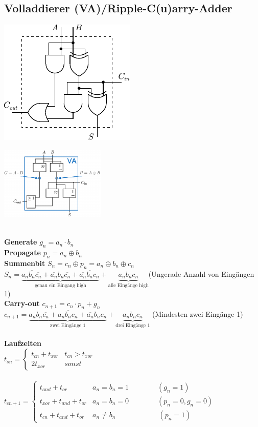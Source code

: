 \documentclass[6pt,a4paper]{scrartcl}
\newcommand{\ol}[1]{\ensuremath{\overline{#1}}}									%
\begin{document}
\begin{multicols*}{3}
\section{Volladdierer (VA)/Ripple-C(u)arry-Adder}
\parbox{5.0cm}{ \includegraphics{./img/ds/volladdierer.pdf} }
\hspace*{-.7cm}\parbox{5.0cm}{ \includegraphics[width=5.0cm]{./img/ds/volladdierer-iec.png} } \\
\textbf{Generate} $g_n = a_n \cdot b_n$\\
\textbf{Propagate} $p_n = a_n \oplus b_n$\\
\textbf{Summenbit} $S_n = c_n \oplus p_n= a_n \oplus b_n \oplus c_n$\\
$S_n = \underbrace{a_n\ol{b_n} \ol{c_n} + \ol{a_n}b_n\ol{c_n} + \ol{a_n}\ol{b_n}c_n}_{\text{genau ein Eingang high}} + \underbrace{a_nb_nc_n}_{\text{alle Eingänge high}}$(Ungerade Anzahl von Eingängen 1) \\
\textbf{Carry-out} $c_{n+1} = c_n \cdot p_n + g_n$\\
$c_{n+1}=\underbrace{a_nb_n\ol{c_n} + a_n\ol{b_n}c_n + \ol{a_n}b_nc_n}_{\text{zwei Eingänge 1}} + \underbrace{a_nb_nc_n}_{\text{drei Eingänge 1}}$ (Mindesten zwei Eingänge 1)
\\ \\
\textbf{Laufzeiten} \\
$t_{sn} = \begin{cases} t_{cn} + t_{xor} & t_{cn} > t_{xor} \\ 2 t_{xor} & sonst \end{cases}$\\ \\
$t_{cn+1} = 
\begin{cases}
	t_{and} + t_{or}           & a_n = b_n = 1 \qquad \qquad (g_n=1)   \\
	t_{xor} + t_{and} + t_{or} & a_n = b_n = 0 \qquad \qquad  (p_n = 0, g_n = 0) \\
	t_{cn} + t_{and} + t_{or}  & a_n \ne b_n \qquad \qquad \qquad  (p_n = 1)
\end{cases}$\\


\end{multicols*}
\end{document}
